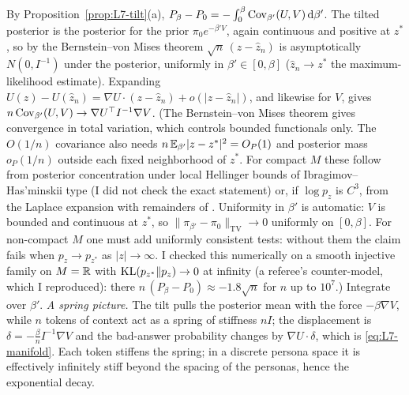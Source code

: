 \begin{beyond}
\LVIIproof By Proposition~\ref{prop:L7-tilt}(a), $P_\beta-P_0=-\int_0^\beta\operatorname{Cov}_{\beta'}(U,V)\,\mathrm{d}\beta'$. The tilted posterior is the posterior for the prior $\pi_0e^{-\beta'V}$, again continuous and positive at $z^*$, so by the Bernstein--von Mises theorem \citep[Thm.~10.1]{vandervaart1998} $\sqrt n\,(z-\hat z_n)$ is asymptotically $N(0,I^{-1})$ under the posterior, uniformly in $\beta'\in[0,\beta]$ ($\hat z_n\to z^*$ the maximum-likelihood estimate). Expanding $U(z)-U(\hat z_n)=\nabla U\cdot(z-\hat z_n)+o(|z-\hat z_n|)$, and likewise for $V$, gives $n\operatorname{Cov}_{\beta'}(U,V)\to\nabla U^{\top}I^{-1}\nabla V$. (The Bernstein--von Mises theorem gives convergence in total variation, which controls bounded functionals only. The $O(1/n)$ covariance also needs $n\,\mathbb{E}_{\beta'}\lvert z-z^*\rvert^2=O_P(1)$ and posterior mass $o_P(1/n)$ outside each fixed neighborhood of $z^*$. For compact $M$ these follow from posterior concentration under local Hellinger bounds of Ibragimov--Has'minskii type (I did not check the exact statement) or, if $\log p_z$ is $C^3$, from the Laplace expansion with remainders of \citealp{tierney1986}. Uniformity in $\beta'$ is automatic: $V$ is bounded and continuous at $z^*$, so $\|\pi_{\beta'}-\pi_0\|_{\mathrm{TV}}\to0$ uniformly on $[0,\beta]$. For non-compact $M$ one must add uniformly consistent tests: without them the claim fails when $p_z\to p_{z^*}$ as $\lvert z\rvert\to\infty$. I checked this numerically on a smooth injective family on $M=\mathbb{R}$ with $\operatorname{KL}(p_{z^*}\|p_z)\to0$ at infinity (a referee's counter-model, which I reproduced): there $n\,(P_\beta-P_0)\approx-1.8\sqrt n$ for $n$ up to $10^7$.) Integrate over $\beta'$. \LVIIqed
\emph{A spring picture.} The tilt pulls the posterior mean with the force $-\beta\nabla V$, while $n$ tokens of context act as a spring of stiffness $nI$; the displacement is $\delta=-\frac\beta nI^{-1}\nabla V$ and the bad-answer probability changes by $\nabla U\cdot\delta$, which is \eqref{eq:L7-manifold}. Each token stiffens the spring; in a discrete persona space it is effectively infinitely stiff beyond the spacing of the personas, hence the exponential decay.
\end{beyond}


